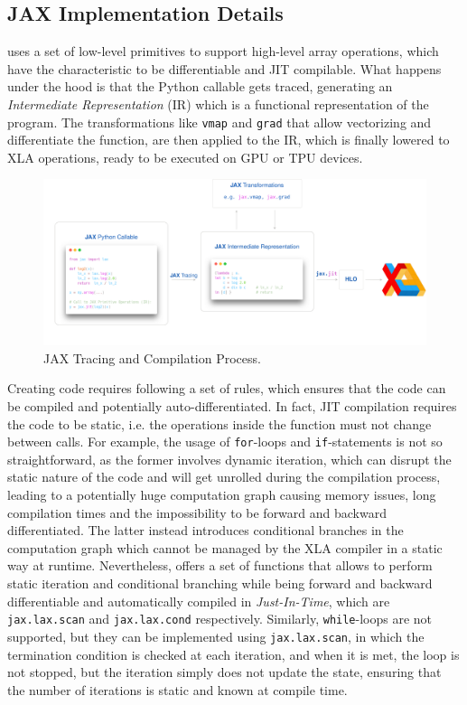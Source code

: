 \subsection{JAX Implementation Details}

\jax uses a set of low-level primitives to support high-level array operations, which have the characteristic to be differentiable and \ac{JIT} compilable. What happens under the hood is that the Python callable gets traced, generating an \textit{Intermediate Representation} (\jax IR) which is a functional representation of the program. The \jax transformations like \texttt{vmap} and \texttt{grad} that allow vectorizing and differentiate the function, are then applied to the \jax IR, which is finally lowered to \ac{XLA} operations, ready to be executed on \ac{GPU} or \ac{TPU} devices.


\begin{figure}
    \centering
    \caption{JAX Tracing and Compilation Process.}
    \includegraphics[width=\textwidth]{Images/jax_compute_graph_short.png}
\end{figure}

Creating \jax code requires following a set of rules, which ensures that the code can be compiled and potentially auto-differentiated. In fact, \ac{JIT} compilation requires the code to be static, i.e. the operations inside the function must not change between calls.
For example, the usage of \texttt{for}-loops and \texttt{if}-statements is not so straightforward, as the former involves dynamic iteration, which can disrupt the static nature of the code and will get unrolled during the compilation process, leading to a potentially huge computation graph causing memory issues, long compilation times and the impossibility to be forward and backward differentiated. The latter instead introduces conditional branches in the computation graph which cannot be managed by the \ac{XLA} compiler in a static way at runtime. Nevertheless, \jax offers a set of functions that allows to perform static iteration and conditional branching while being forward and backward differentiable and automatically compiled in \textit{Just-In-Time}, which are \texttt{jax.lax.scan} and \texttt{jax.lax.cond} respectively. Similarly, \texttt{while}-loops are not supported, but they can be implemented using \texttt{jax.lax.scan}, in which the termination condition is checked at each iteration, and when it is met, the loop is not stopped, but the iteration simply does not update the state, ensuring that the number of iterations is static and known at compile time.


